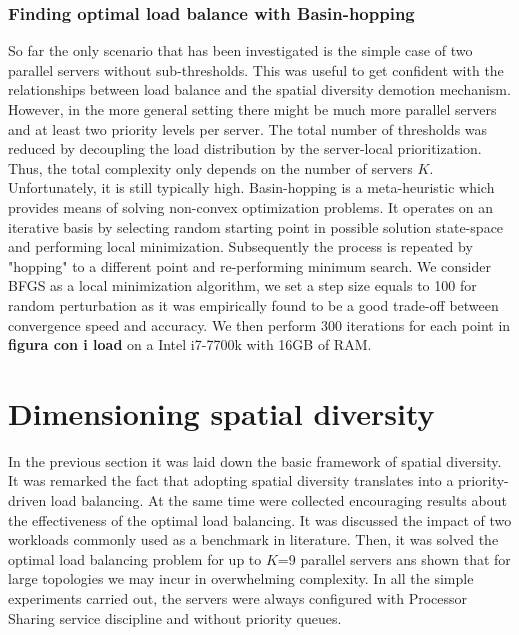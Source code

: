 \subsubsection{Finding optimal load balance with Basin-hopping}
So far the only scenario that has been investigated is the simple case of two parallel servers without sub-thresholds. This was useful to get confident with the relationships between load balance and the spatial diversity demotion mechanism. However, in the more general setting there might be much more parallel servers and at least two priority levels per server. The total number of thresholds was reduced by decoupling the load distribution by the server-local prioritization. Thus, the total complexity only depends on the number of servers $K$. Unfortunately, it is still typically high. 
Basin-hopping is a meta-heuristic which provides means of solving non-convex optimization problems.
It operates on an iterative basis by selecting random starting point in possible solution state-space and performing local minimization. 
Subsequently the process is repeated by "hopping" to a different point and re-performing minimum search.
We consider BFGS as a local minimization algorithm, we set a step size equals to 100 for random perturbation as it was empirically found to be a good trade-off between convergence speed and accuracy.
We then perform 300 iterations for each point in \textbf{figura con i load} on a Intel i7-7700k with 16GB of RAM.
\section{Dimensioning spatial diversity}
In the previous section it was laid down the basic framework of spatial diversity. It was remarked the fact that adopting spatial diversity translates into a priority-driven load balancing. At the same time were collected encouraging results about the effectiveness of the optimal load balancing. It was discussed the impact of two workloads commonly used as a benchmark in literature. Then, it was solved the optimal load balancing problem for up to $K$=9 parallel servers ans shown that for large topologies we may incur in overwhelming complexity. In all the simple experiments carried out, the servers were always configured with Processor Sharing service discipline and without priority queues.

